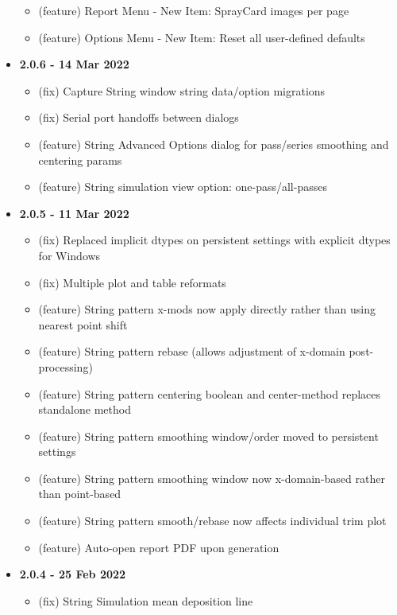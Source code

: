 \documentclass[10pt,letterpaper,titlepage]{article}
\begin{document}
\begin{itemize}
\begin{itemize}
            \item (feature) Report Menu - New Item: SprayCard images per page
            \item (feature) Options Menu - New Item: Reset all user-defined defaults
        \end{itemize}
        \item \textbf{2.0.6 - 14 Mar 2022}
        \begin{itemize}
            \item (fix) Capture String window string data/option migrations
            \item (fix) Serial port handoffs between dialogs
            \item (feature) String Advanced Options dialog for pass/series smoothing and centering params
            \item (feature) String simulation view option: one-pass/all-passes
        \end{itemize}
        \item \textbf{2.0.5 - 11 Mar 2022}
        \begin{itemize}
            \item (fix) Replaced implicit dtypes on persistent settings with explicit dtypes for Windows
            \item (fix) Multiple plot and table reformats 
            \item (feature) String pattern x-mods now apply directly rather than using nearest point shift
            \item (feature) String pattern rebase (allows adjustment of x-domain post-processing)
            \item (feature) String pattern centering boolean and center-method replaces standalone method
            \item (feature) String pattern smoothing window/order moved to persistent settings
            \item (feature) String pattern smoothing window now x-domain-based rather than point-based 
            \item (feature) String pattern smooth/rebase now affects individual trim plot
            \item (feature) Auto-open report PDF upon generation
        \end{itemize}
        \item \textbf{2.0.4 - 25 Feb 2022}
        \begin{itemize}
            \item (fix) String Simulation mean deposition line

\end{itemize}
\end{itemize}
\end{document}
